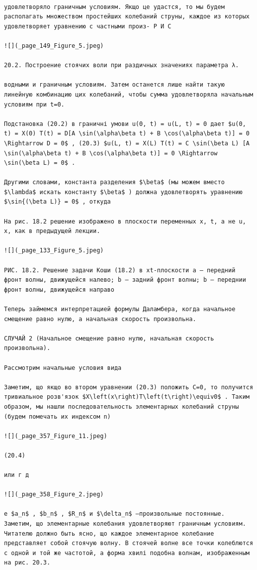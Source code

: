 \documentclass[
  ukrainian,
]{article}
\begin{document}
\begin{verbatim}

удовлетворяло граничным условиям. Якщо це удастся, то мы будем располагать множеством простейших колебаний струны, каждое из которых удовлетворяет уравнению с частными произ- Р И С

![](_page_149_Figure_5.jpeg)

20.2. Построение стоячих воли при раздичных значениях параметра λ.

водными и граничным условиям. Затем останется лише найти такую линейную комбинацию цих колебаний, чтобы сумма удовлетворяла начальным условиям при t=0.

Подстановка (20.2) в граничні умови u(0, t) = u(L, t) = 0 дает $u(0, t) = X(0) T(t) = D[A \sin(\alpha\beta t) + B \cos(\alpha\beta t)] = 0 \Rightarrow D = 0$ , (20.3) $u(L, t) = X(L) T(t) = C \sin(\beta L) [A \sin(\alpha\beta t) + B \cos(\alpha\beta t)] = 0 \Rightarrow \sin(\beta L) = 0$ .

Другими словами, константа разделения $\beta$ (мы можем вместо $\lambda$ искать константу $\beta$ ) должна удовлетворять уравнению $\sin{(\beta L)} = 0$ , откуда

На рис. 18.2 решение изображено в плоскости переменных x, t, а не u, x, как в предыдущей лекции.

![](_page_133_Figure_5.jpeg)

РИС. 18.2. Решение задачи Коши (18.2) в xt-плоскости a — передний фронт волны, движущейся налево; b — задний фронт волны; b — переднии фронт волны, движущейся направо

Теперь займемся интерпретацией формулы Даламбера, когда начальное смещение равно нулю, а начальная скорость произвольна.

СЛУЧАЙ 2 (Начальное смещение равно нулю, начальная скорость произвольна).

Рассмотрим начальные условия вида

Заметим, що якщо во втором уравнении (20.3) положить C=0, то получится тривиальное розв'язок $X\left(x\right)T\left(t\right)\equiv0$ . Таким образом, мы нашли последовательность элементарных колебаний струны (будем помечать их индексом n)

![](_page_357_Figure_11.jpeg)

(20.4)

или г д

![](_page_358_Figure_2.jpeg)

е $a_n$ , $b_n$ , $R_n$ и $\delta_n$ —произвольные постоянные. Заметим, що элементарные колебания удовлетворяют граничным условиям. Читателю должно быть ясно, що каждое элементарное колебание представляет собой стоячую волну. В стоячей волне все точки колеблются с одной и той же частотой, а форма хвилі подобна волнам, изображенным на рис. 20.3.


\end{verbatim}
\end{document}
